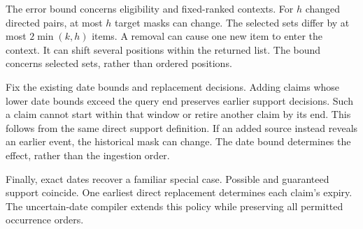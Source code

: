 The error bound concerns eligibility and fixed-ranked contexts.
For $h$ changed directed pairs, at most $h$ target masks can change.
The selected sets differ by at most $2\min(k,h)$ items.
A removal can cause one new item to enter the context.
It can shift several positions within the returned list.
The bound concerns selected sets, rather than ordered positions.

Fix the existing date bounds and replacement decisions.
Adding claims whose lower date bounds exceed the query end preserves earlier support decisions.
Such a claim cannot start within that window or retire another claim by its end.
This follows from the same direct support definition.
If an added source instead reveals an earlier event, the historical mask can change.
The date bound determines the effect, rather than the ingestion order.

Finally, exact dates recover a familiar special case.
Possible and guaranteed support coincide.
One earliest direct replacement determines each claim's expiry.
The uncertain-date compiler extends this policy while preserving all permitted occurrence orders.
